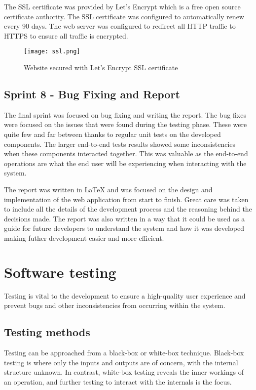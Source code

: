 The SSL certificate was provided by Let's Encrypt which is a free open source certificate authority. The SSL certificate was configured to automatically renew every 90 days. The web server was configured to redirect all HTTP traffic to HTTPS to ensure all traffic is encrypted.

\begin{figure}[ht!]
    \centerline{\texttt{[image: ssl.png]}}
    \caption{Website secured with Let's Encrypt SSL certificate}
    \label{fig:ssl}
\end{figure}

\subsection{Sprint 8 - Bug Fixing and Report}
The final sprint was focused on bug fixing and writing the report. The bug fixes were focused on the issues that were found during the testing phase. These were quite few and far between thanks to regular unit tests on the developed components. The larger end-to-end tests results showed some inconsistencies when these components interacted together. This was valuable as the end-to-end operations are what the end user will be experiencing when interacting with the system. 

The report was written in LaTeX and was focused on the design and implementation of the web application from start to finish. Great care was taken to include all the details of the development process and the reasoning behind the decisions made. The report was also written in a way that it could be used as a guide for future developers to understand the system and how it was developed making futher development easier and more efficient.



\section{Software testing}

Testing is vital to the development to ensure a high-quality user experience and prevent bugs and other inconsistencies from occurring within the system.

\subsection{Testing methods}
Testing can be approached from a black-box or white-box technique. Black-box testing is where only the inputs and outputs are of concern, with the internal structure unknown. In contrast, white-box testing reveals the inner workings of an operation, and further testing to interact with the internals is the focus.

